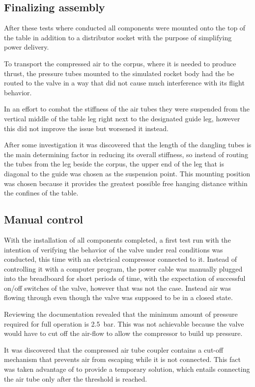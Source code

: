 \subsection{Finalizing assembly}
After these tests where conducted all components were mounted onto the top of the table in addition to a distributor socket with the purpose of simplifying power delivery.

To transport the compressed air to the corpus, where it is needed to produce thrust, the pressure tubes mounted to the simulated rocket body had the be routed to the valve in a way that did not cause much interference with its flight behavior. 

In an effort to combat the stiffness of the air tubes they were suspended from the vertical middle of the table leg right next to the designated guide leg, however this did not improve the issue but worsened it instead. 

After some investigation it was discovered that the length of the dangling tubes is the main determining factor in reducing its overall stiffness, so instead of routing the tubes from the leg beside the corpus, the upper end of the leg that is diagonal to the guide was chosen as the suspension point. This mounting position was chosen because it provides the greatest possible free hanging distance within the confines of the table.


\subsection{Manual control}
With the installation of all components completed, a first test run with the intention of verifying the behavior of the valve under real conditions was conducted, this time with an electrical compressor connected to it. Instead of controlling it with a computer program, the power cable was manually plugged into the breadboard for short periods of time, with the expectation of successful on/off switches of the valve, however that was not the case. Instead air was flowing through even though the valve was supposed to be in a closed state. 

Reviewing the documentation revealed that the minimum amount of pressure required for full operation is \SI{2,5}{\bar}. This was not achievable because the valve would have to cut off the air-flow to allow the compressor to build up pressure.

It was discovered that the compressed air tube coupler contains a cut-off mechanism that prevents air from escaping while it is not connected. This fact was taken advantage of to provide a temporary solution, which entails connecting the air tube only after the threshold is reached. 


